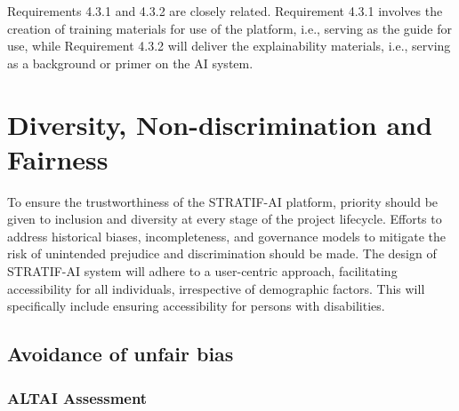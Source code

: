 \documentclass[
  letterpaper,
  DIV=11,
  numbers=noendperiod]{scrreport}
\begin{document}
\begin{tcolorbox}[enhanced jigsaw, arc=.35mm, breakable, coltitle=black, toptitle=1mm, colbacktitle=quarto-callout-note-color!10!white, toprule=.15mm, left=2mm, bottomrule=.15mm, opacitybacktitle=0.6, titlerule=0mm, colback=white, opacityback=0, title=\textcolor{quarto-callout-note-color}{\faInfo}\hspace{0.5em}{Note}, bottomtitle=1mm, colframe=quarto-callout-note-color-frame, leftrule=.75mm, rightrule=.15mm]

Requirements 4.3.1 and 4.3.2 are closely related. Requirement 4.3.1
involves the creation of training materials for use of the platform,
i.e., serving as the guide for use, while Requirement 4.3.2 will deliver
the explainability materials, i.e., serving as a background or primer on
the AI system.

\end{tcolorbox}


\hypertarget{diversity-non-discrimination-and-fairness}{%
\chapter{Diversity, Non-discrimination and
Fairness}\label{diversity-non-discrimination-and-fairness}}

To ensure the trustworthiness of the STRATIF-AI platform, priority
should be given to inclusion and diversity at every stage of the project
lifecycle. Efforts to address historical biases, incompleteness, and
governance models to mitigate the risk of unintended prejudice and
discrimination should be made. The design of STRATIF-AI system will
adhere to a user-centric approach, facilitating accessibility for all
individuals, irrespective of demographic factors. This will specifically
include ensuring accessibility for persons with disabilities.

\hypertarget{avoidance-of-unfair-bias}{%
\section{Avoidance of unfair bias}\label{avoidance-of-unfair-bias}}

\hypertarget{altai-assessment-11}{%
\subsection*{ALTAI Assessment}\label{altai-assessment-11}}
\end{document}
